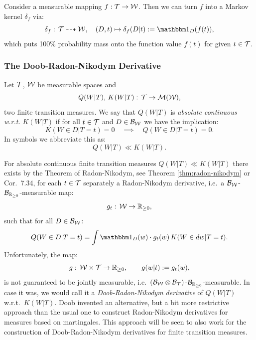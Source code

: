 \begin{Rem}
    Consider a measurable mapping $f: \mathcal{T} \to \mathcal{W}$. Then we can turn $f$ into a Markov kernel $\delta_f$ via:
    \[  \delta_f:\, \Tcal \dshto \Wcal, \quad (D,t) \mapsto \delta_f(D|t):= \I_D(f(t)),\]
    which puts 100\% probability mass onto the function value $f(t)$ for given $t \in \mathcal{T}$.
\end{Rem}


\subsubsection{The Doob-Radon-Nikodym Derivative}


\begin{Def}\label{def:absolute_continuity}
    Let $\mathcal{T}$, $\mathcal{W}$ be  measurable spaces and
    \[ Q(W|T),\,K(W|T):\, \mathcal{T} \to \mathcal{M}(\mathcal{W}),  \]
    two finite transition measures. 
    We say that $Q(W|T)$ is \emph{absolute continuous w.r.t.} $K(W|T)$ if for all $t \in \mathcal{T}$ and $D \in \mathcal{B}_{\mathcal{W}}$ 
    we have the implication:
    \[ K(W \in D|T=t) =0 \quad \implies \quad Q(W \in D|T=t) =0.  \]
    In symbols we abbreviate this as:
    \[  Q(W|T) \ll K(W|T).\]
\end{Def}

\begin{Rem}
    For absolute continuous finite transition measures $Q(W|T) \ll K(W|T)$ there exists by the Theorem of Radon-Nikodym, see Theorem \ref{thm:radon-nikodym} or \cite{Kle20} Cor.\ 7.34,
    for each $t \in \mathcal{T}$ separately a Radon-Nikodym derivative, i.e.\ a $\mathcal{B}_{\mathcal{W}}$-$\mathcal{B}_{\mathbb{R}_{\ge0}}$-measurable map:
    \[ g_t:\, \mathcal{W} \to \mathbb{R}_{\ge 0},\]
    such that for all $D \in \mathcal{B}_{\mathcal{W}}$:
    \[ Q(W \in D|T=t) = \int \I_D(w) \cdot g_t(w) \, K(W \in dw|T=t). \]
    Unfortunately, the map:
    \[  g:\, \mathcal{W} \times \mathcal{T} \to \mathbb{R}_{\ge0},\qquad g(w|t):=g_t(w),\]
    is not guaranteed to be jointly measurable, i.e.\ $(\mathcal{B}_{\mathcal{W}}\otimes\mathcal{B}_{\mathcal{T}})$-$\mathcal{B}_{\mathbb{R}_{\ge0}}$-measurable.
    In case it was, we would call it a \emph{Doob-Radon-Nikodym derivative} of  $Q(W|T)$ w.r.t.\ $K(W|T)$.
    Doob invented an alternative, but a bit more restrictive approach than the usual one
    to construct Radon-Nikodym derivatives for measures based on martingales.
    This approach will be seen to also work for the construction of Doob-Radon-Nikodym derivatives for finite transition measures.
\end{Rem}



